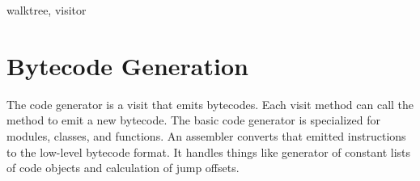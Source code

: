 \documentclass{manual}
\begin{document}
\begin{funcdesc}{walk}{tree, visitor}
\end{funcdesc}

\chapter{Bytecode Generation}

The code generator is a visit that emits bytecodes.  Each visit method
can call the  method to emit a new bytecode.  The basic
code generator is specialized for modules, classes, and functions.  An
assembler converts that emitted instructions to the low-level bytecode
format.  It handles things like generator of constant lists of code
objects and calculation of jump offsets.

%
%
%
\renewcommand{\indexname}{Module Index}

\renewcommand{\indexname}{Index}
\end{document}
